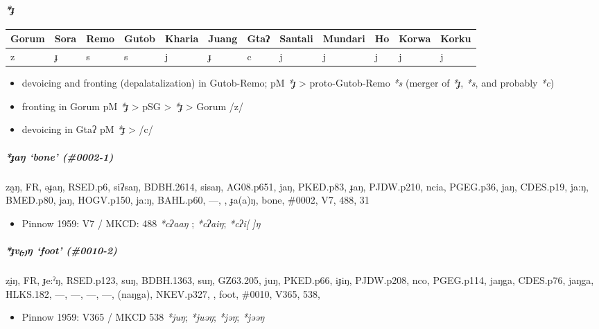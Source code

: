 \documentclass[a4paper,]{article}
\providecommand{\tightlist}{%
  \setlength{\itemsep}{0pt}\setlength{\parskip}{0pt}}
\let\oldparagraph\paragraph
\renewcommand{\paragraph}[1]{\oldparagraph{#1}\mbox{}}
\let\oldsubparagraph\subparagraph
\renewcommand{\subparagraph}[1]{\oldsubparagraph{#1}\mbox{}}
\begin{document}
\paragraph{\texorpdfstring{\emph{*ɟ}}{*ɟ}}\label{ux25f}

\begin{longtable}[]{@{}llllllllllll@{}}
\toprule
Gorum & Sora & Remo & Gutob & Kharia & Juang & Gtaʔ & Santali & Mundari
& Ho & Korwa & Korku\tabularnewline
\midrule
\endhead
z & ɟ & s & s & j & ɟ & c & j & j & j & j & j\tabularnewline
\bottomrule
\end{longtable}

\begin{itemize}
\tightlist
\item
  devoicing and fronting (depalatalization) in Gutob-Remo; pM \emph{*ɟ}
  \textgreater{} proto-Gutob-Remo \emph{*s} (merger of \emph{*ɟ},
  \emph{*s}, and probably \emph{*c})
\item
  fronting in Gorum pM \emph{*ɟ} \textgreater{} pSG \textgreater{}
  \emph{*ɟ} \textgreater{} Gorum /z/
\item
  devoicing in Gtaʔ pM \emph{*ɟ} \textgreater{} /c/
\end{itemize}

\subparagraph{\texorpdfstring{\emph{*ɟaŋ} `bone'
(\#0002-1)}{*ɟaŋ bone (\#0002-1)}}\label{ux25faux14b-bone-0002-1}

za̰ŋ, FR, əɟaŋ, RSED.p6, siʔsaŋ, BDBH.2614, sisaŋ, AG08.p651, jaŋ,
PKED.p83, ɟaŋ, PJDW.p210, ncia, PGEG.p36, jaŋ, CDES.p19, ja:ŋ, BMED.p80,
jaŋ, HOGV.p150, ja:ŋ, BAHL.p60, ---, , ɟa(a)ŋ, bone, \#0002, V7, 488, 31

\begin{itemize}
\tightlist
\item
  Pinnow 1959: V7 / MKCD: 488 \emph{*cʔaaŋ} ; \emph{*cʔaiŋ};
  \emph{*cʔi{[} {]}ŋ}
\end{itemize}

\subparagraph{\texorpdfstring{\emph{*ɟv₍₇₎ŋ} `foot'
(\#0010-2)}{*ɟv₍₇₎ŋ foot (\#0010-2)}}\label{ux25fvux14b-foot-0010-2-1}

zḭŋ, FR, ɟe:ˀŋ, RSED.p123, suŋ, BDBH.1363, suŋ, GZ63.205, juŋ, PKED.p66,
iɟiŋ, PJDW.p208, nco, PGEG.p114, jaŋga, CDES.p76, jaŋga, HLKS.182, ---,
---, ---, ---, (naŋga), NKEV.p327, , foot, \#0010, V365, 538,

\begin{itemize}
\tightlist
\item
  Pinnow 1959: V365 / MKCD 538 \emph{*juŋ}; \emph{*juəŋ}; \emph{*jəŋ};
  \emph{*jəəŋ}
\end{itemize}
\end{document}
